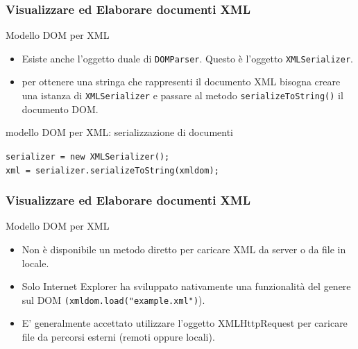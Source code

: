 \begin{frame}
    \frametitle{Visualizzare ed Elaborare documenti XML}
    \addtocounter{nframe}{1}
    

     \begin{block}{Modello DOM per XML}
        \begin{itemize}
            \item Esiste anche l'oggetto duale di \texttt{DOMParser}. Questo è l'oggetto \texttt{XMLSerializer}.
            \item  per ottenere una stringa che rappresenti il documento XML bisogna creare una istanza di \texttt{XMLSerializer} e passare al metodo \texttt{serializeToString()} il documento DOM.
        \end{itemize}
        
     \end{block}

     \begin{block}{modello DOM per XML: serializzazione di documenti}
       
        \texttt{serializer = new XMLSerializer();}
        \\\texttt{xml = serializer.serializeToString(xmldom);}
        
     \end{block}
     
\end{frame}

\begin{frame}
    \frametitle{Visualizzare ed Elaborare documenti XML}
    \addtocounter{nframe}{1}
    

     \begin{block}{Modello DOM per XML}
        \begin{itemize}
            \item Non è disponibile un metodo diretto per caricare XML da server o da file in locale. 
            \item Solo Internet Explorer ha sviluppato nativamente una funzionalità del genere sul DOM \texttt{(xmldom.load("example.xml")}).
            \item E' generalmente accettato utilizzare l'oggetto XMLHttpRequest per caricare file da percorsi esterni (remoti oppure locali).
        \end{itemize}
        
     \end{block}

     
\end{frame}

